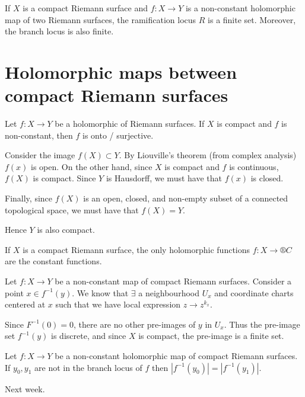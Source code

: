 \documentclass[12pt]{article}					%
\begin{document}
\begin{lemma}
	If $X$ is a compact Riemann surface and $f: X \rightarrow Y$ is a non-constant holomorphic map of two Riemann surfaces, the ramification locus $R$ is a finite set. Moreover, the branch locus is also finite.
\end{lemma}

\section{Holomorphic maps between compact Riemann surfaces}
\begin{veta}
	Let $f: X \rightarrow Y$ be a holomorphic of Riemann surfaces. If $X$ is compact and $f$ is non-constant, then $f$ is onto / surjective.

	\begin{dukazin}
		Consider the image $f(X) \subset Y$. By Liouville's theorem (from complex analysis) $f(x)$ is open. On the other hand, since $X$ is compact and $f$ is continuous, $f(X)$ is compact. Since $Y$ is Hausdorff, we must have that $f(x)$ is closed.

		Finally, since $f(X)$ is an open, closed, and non-empty subset of a connected topological space, we must have that $f(X) = Y$.
	\end{dukazin}
\end{veta}

\begin{dusledek}
	Hence $Y$ is also compact.
\end{dusledek}

\begin{dusledek}
	If $X$ is a compact Riemann surface, the only holomorphic functions $f: X \rightarrow ®C$ are the constant functions.
\end{dusledek}

\begin{poznamka}[Discusion]
	Let $f: X \rightarrow Y$ be a non-constant map of compact Riemann surfaces. Consider a point $x \in f^{-1}(y)$. We know that $\exists$ a neighbourhood $U_x$ and coordinate charts centered at $x$ such that we have local expression $z \rightarrow z^{k_x}$.

	Since $F^{-1}(0) = 0$, there are no other pre-images of $y$ in $U_x$. Thus the pre-image set $f^{-1}(y)$ is discrete, and since $X$ is compact, the pre-image is a finite set.
\end{poznamka}

\begin{veta}
	Let $f: X \rightarrow Y$ be a non-constant holomorphic map of compact Riemann surfaces. If $y_0, y_1$ are not in the branch locus of $f$ then $|f^{-1}(y_0)| = |f^{-1}(y_1)|$.

	\begin{dukazin}
		Next week.
	\end{dukazin}
\end{veta}
\end{document}
